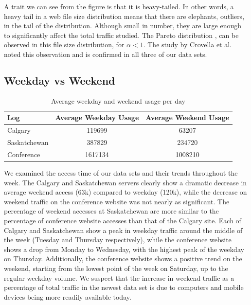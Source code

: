 \documentclass[10pt,conference]{IEEEtran}
\begin{document}
A trait we can see from the figure is that it is heavy-tailed. In other words, a heavy tail in a web file size distribution means that there are elephants, outliers, in the tail of the distribution. Although small in number, they are large enough to significantly affect the total traffic studied. The Pareto distribution \cite{Kotz}, can be observed in this file size distribution, for \begin{math} \alpha < 1\end{math}. The study by Crovella et al. \cite{Crovella} noted this observation and is confirmed in all three of our data sets.

\subsection{Weekday vs Weekend} %
\label{sub:weekday_vs_weekend}
\begin{table}[h]
    \caption{Average weekday and weekend usage per day}\label{tab:weeklyusage}
    \begin{tabular}{l | c c}
        Log & Average Weekday Usage & Average Weekend Usage\\
        \hline
        Calgary & 119699 & 63207\\
        Saskatchewan & 387829 & 234720\\
        Conference & 1617134 & 1008210
    \end{tabular}
\end{table}

We examined the access time of our data sets and their trends throughout the week. The Calgary and Saskatchewan servers clearly show a dramatic decrease in average weekend access (63k) compared to weekday (120k), while the decrease on weekend traffic on the conference website was not nearly as significant. The percentage of weekend accesses at Saskatchewan are more similar to the percentage of conference website accesses than that of the Calgary site. Each of Calgary and Saskatchewan show a peak in weekday traffic around the middle of the week (Tuesday and Thursday respectively), while the conference website shows a drop from Monday to Wednesday, with the highest peak of the weekday on Thursday. Additionally, the conference website shows a positive trend on the weekend, starting from the lowest point of the week on Saturday, up to the regular weekday volume. We suspect that the increase in weekend traffic as a percentage of total traffic in the newest data set is due to computers and mobile devices being more readily available today.
\end{document}
